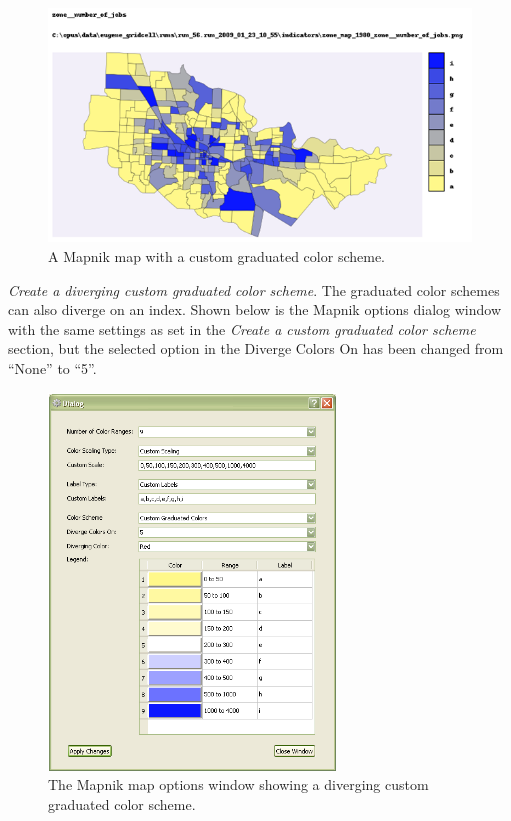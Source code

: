 \begin{figure}[hbp]
\begin{center}
\includegraphics[width=\textwidth]{part-gui/images/sample-map-custom-settings-2.png}
\end{center}
\caption{A Mapnik map with a custom graduated color scheme.}
\label{fig:sample-map-custom-settings-2}
\end{figure}
\clearpage

\emph{Create a diverging custom graduated color scheme}. 
The graduated color 
schemes can also diverge on an index. Shown below is the Mapnik options 
dialog window with the same settings as set in the 
\emph{Create a custom graduated color scheme} section, 
but the selected option in the Diverge Colors On has been changed 
from ``None'' to ``5''.

\begin{figure}[hb]
\begin{center}
\includegraphics[width=3in]{part-gui/images/result-manager-mapnik-options-example-3.png}
\end{center}
\caption{The Mapnik map options window showing a diverging custom graduated color scheme.}
\label{fig:result-manager-mapnik-options-example-3}
\end{figure}
\clearpage

